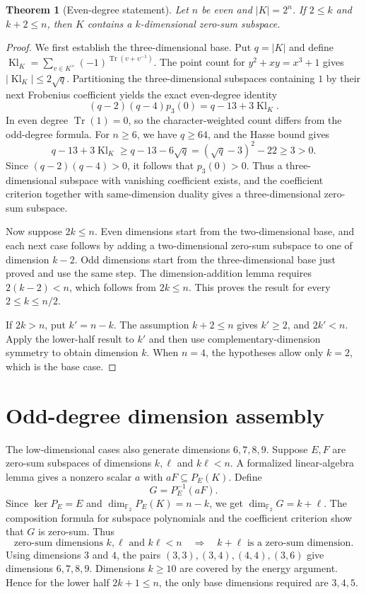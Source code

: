 \documentclass[11pt]{amsart}
\numberwithin{equation}{section}
\newtheorem{theorem}{Theorem}[section]
\theoremstyle{definition}
\theoremstyle{remark}
\newcommand{\Ftwo}{\mathbb F_2}
\newcommand{\dimf}{\dim_{\Ftwo}}
\begin{document}
\begin{theorem}[Even-degree statement]\label{thm:even}
Let $n$ be even and $|K|=2^n$. If $2\le k$ and $k+2\le n$, then $K$ contains a $k$-dimensional zero-sum subspace.
\end{theorem}
\begin{proof}
We first establish the three-dimensional base. Put $q=|K|$ and define $\operatorname{Kl}_K=\sum_{v\in K^\times}(-1)^{\operatorname{Tr}(v+v^{-1})}$. The point count for $y^2+xy=x^3+1$ gives $|\operatorname{Kl}_K|\le2\sqrt q$. Partitioning the three-dimensional subspaces containing $1$ by their next Frobenius coefficient yields the exact even-degree identity
\[
 (q-2)(q-4)p_3(0)=q-13+3\operatorname{Kl}_K.
\]
In even degree $\operatorname{Tr}(1)=0$, so the character-weighted count differs from the odd-degree formula. For $n\ge6$, we have $q\ge64$, and the Hasse bound gives
\[
q-13+3\operatorname{Kl}_K\ge q-13-6\sqrt q=(\sqrt q-3)^2-22\ge3>0.
\]
Since $(q-2)(q-4)>0$, it follows that $p_3(0)>0$. Thus a three-dimensional subspace with vanishing coefficient exists, and the coefficient criterion together with same-dimension duality gives a three-dimensional zero-sum subspace.

Now suppose $2k\le n$. Even dimensions start from the two-dimensional base, and each next case follows by adding a two-dimensional zero-sum subspace to one of dimension $k-2$. Odd dimensions start from the three-dimensional base just proved and use the same step. The dimension-addition lemma requires $2(k-2)<n$, which follows from $2k\le n$. This proves the result for every $2\le k\le n/2$.

If $2k>n$, put $k'=n-k$. The assumption $k+2\le n$ gives $k'\ge2$, and $2k'<n$. Apply the lower-half result to $k'$ and then use complementary-dimension symmetry to obtain dimension $k$. When $n=4$, the hypotheses allow only $k=2$, which is the base case.
\end{proof}

\section{Odd-degree dimension assembly}

The low-dimensional cases also generate dimensions $6,7,8,9$. Suppose $E,F$ are zero-sum subspaces of dimensions $k,\ell$ and $k\ell<n$. A formalized linear-algebra lemma gives a nonzero scalar $a$ with $aF\subseteq P_E(K)$. Define
\[
 G=P_E^{-1}(aF).
\]
Since $\ker P_E=E$ and $\dimf P_E(K)=n-k$, we get $\dimf G=k+\ell$. The composition formula for subspace polynomials and the coefficient criterion show that $G$ is zero-sum. Thus
\begin{equation}\label{eq:add}
 \text{zero-sum dimensions }k,\ell\text{ and }k\ell<n
 \quad\Longrightarrow\quad k+\ell\text{ is a zero-sum dimension}.
\end{equation}
Using dimensions $3$ and $4$, the pairs $(3,3),(3,4),(4,4),(3,6)$ give dimensions $6,7,8,9$. Dimensions $k\ge10$ are covered by the energy argument. Hence for the lower half $2k+1\le n$, the only base dimensions required are $3,4,5$.
\end{document}
